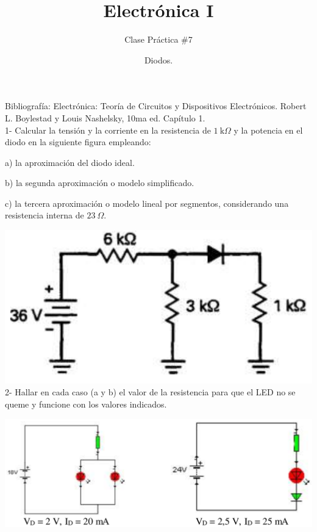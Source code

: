 \documentclass[10pt,letterpaper]{article}
\author{Clase Práctica $\#$7}
\title{Electrónica I}
\date{Diodos.}
\begin{document}
	\maketitle
	
Bibliografía: Electrónica: Teoría de Circuitos y Dispositivos Electrónicos. Robert L. Boylestad y Louis Nashelsky, 10ma ed. Capítulo 1.
\\

1- Calcular la tensión y la corriente en la resistencia de $1 \: \mathrm{k}\Omega$ y la potencia en el diodo en la siguiente figura empleando:

a) la aproximación del diodo ideal.

b) la segunda aproximación o modelo simplificado.

c) la tercera aproximación o modelo lineal por segmentos, considerando una resistencia interna de $23 \: \Omega$.

\includegraphics[scale=0.27]{c1.png} 
\\

%

2- Hallar en cada caso (a y b) el valor de la resistencia para que el LED no se queme y funcione con los valores indicados.

\includegraphics[scale=0.35]{c2.png} \\
\end{document}
